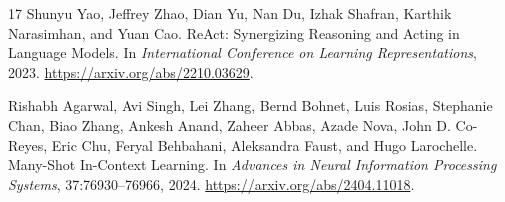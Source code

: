 \documentclass[10pt,twocolumn,letterpaper]{article}
\begin{document}
\begin{thebibliography}{17}
Shunyu Yao, Jeffrey Zhao, Dian Yu, Nan Du, Izhak Shafran, Karthik Narasimhan, and Yuan Cao.
\newblock ReAct: Synergizing Reasoning and Acting in Language Models.
\newblock In \emph{International Conference on Learning Representations}, 2023.
\newblock \url{https://arxiv.org/abs/2210.03629}.

Rishabh Agarwal, Avi Singh, Lei Zhang, Bernd Bohnet, Luis Rosias, Stephanie Chan, Biao Zhang, Ankesh Anand, Zaheer Abbas, Azade Nova, John D. Co-Reyes, Eric Chu, Feryal Behbahani, Aleksandra Faust, and Hugo Larochelle.
\newblock Many-Shot In-Context Learning.
\newblock In \emph{Advances in Neural Information Processing Systems}, 37:76930--76966, 2024.
\newblock \url{https://arxiv.org/abs/2404.11018}.

\end{thebibliography}
\end{document}
